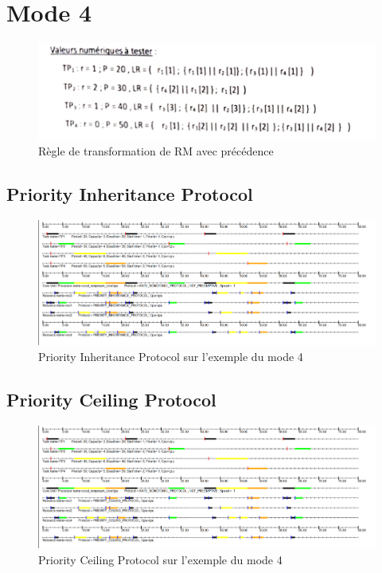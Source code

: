 \section{Mode 4}{

  \begin{figure}[H]
    \centering
    \includegraphics[width=13cm]{
      img/mode4/exemples.png
    }
    \caption{Règle de transformation de RM avec précédence}
  \end{figure}

  \subsection{Priority Inheritance Protocol}{
    \begin{figure}[H]
      \centering
      \includegraphics[width=16cm]{
        img/mode4/pip/pip.png
      }
      \caption{Priority Inheritance Protocol sur l'exemple du mode 4}
    \end{figure}
  }
  \subsection{Priority Ceiling Protocol}{
    \begin{figure}[H]
      \centering
      \includegraphics[width=16cm]{
        img/mode4/pcp/pcp.png
      }
      \caption{Priority Ceiling Protocol sur l'exemple du mode 4}
    \end{figure}
  }
 }

\newpage